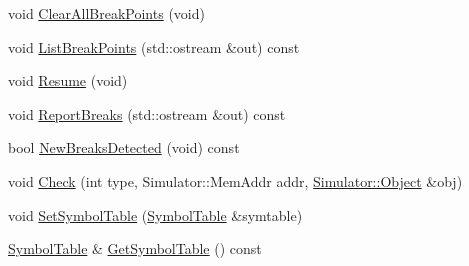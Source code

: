 \begin{DoxyCompactItemize}
\item 
void \hyperlink{class_simulator_1_1_break_point_manager_abfcda8bf0a03060188c3a491a9000553}{Clear\+All\+Break\+Points} (void)
\item 
void \hyperlink{class_simulator_1_1_break_point_manager_a1c5874f7b1b33a65feabb8b50270f72c}{List\+Break\+Points} (std\+::ostream \&out) const 
\item 
void \hyperlink{class_simulator_1_1_break_point_manager_a6c8fece4f41fff6618d40e09cd56a381}{Resume} (void)
\item 
void \hyperlink{class_simulator_1_1_break_point_manager_a6ede48c906f70b4ba107b62f1d3a2222}{Report\+Breaks} (std\+::ostream \&out) const 
\item 
bool \hyperlink{class_simulator_1_1_break_point_manager_a5748b6f13c95438ab197c4709b9c5db0}{New\+Breaks\+Detected} (void) const 
\item 
void \hyperlink{class_simulator_1_1_break_point_manager_a33bf787698426b649ffb4ab7aaad727e}{Check} (int type, Simulator\+::\+Mem\+Addr addr, \hyperlink{class_simulator_1_1_object}{Simulator\+::\+Object} \&obj)
\item 
void \hyperlink{class_simulator_1_1_break_point_manager_a173d134ed8cb70c53823f9e423773d4d}{Set\+Symbol\+Table} (\hyperlink{class_simulator_1_1_symbol_table}{Symbol\+Table} \&symtable)
\item 
\hyperlink{class_simulator_1_1_symbol_table}{Symbol\+Table} \& \hyperlink{class_simulator_1_1_break_point_manager_ae2242fce958d0394560440b12fac45d3}{Get\+Symbol\+Table} () const 
\end{DoxyCompactItemize}



